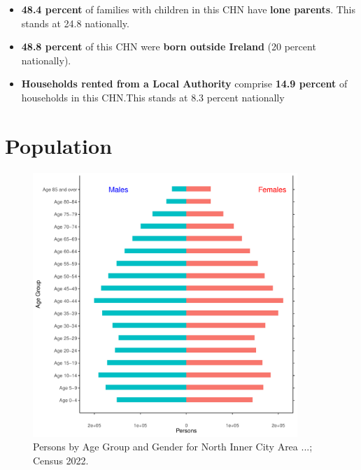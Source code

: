 \documentclass{article}
\begin{document}
\begin{itemize}
\item \textbf{48.4 percent} of families with children in this CHN have \textbf{lone parents}. This stands at 24.8 nationally.

\item \textbf{48.8 percent} of this CHN were \textbf{born outside Ireland} (20 percent nationally).

\item \textbf{Households rented from a Local Authority} comprise \textbf{14.9 percent} of households in this CHN.This stands at 8.3 percent nationally

\end{itemize}

\pagebreak

\section{Population} 
\label{sect:Pop}

\begin{figure}[h]
	\centering
	\includegraphics[width = 100mm]{../figures/PyramidPlot.pdf}
	\caption{Persons by Age Group and Gender for North Inner City Area ...; Census 2022.}
	\label{fig:2ae19629-1a6a-13a3-e055-000000000001}
	\end{figure}
\end{document}
